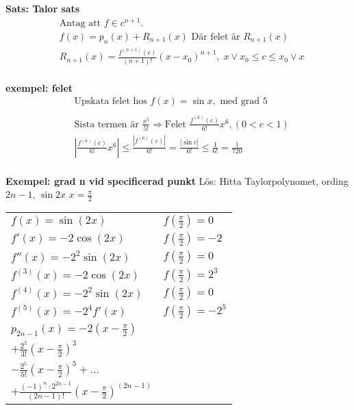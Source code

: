 \begin{multicols}{2}
\textbf{Sats: Talor sats}
\begin{align*}
  &\text{Antag att $f\in c^{n+1}$.} \\
  &f(x)=p_n(x)+R_{n+1}(x) \text{ Där felet är } R_{n+1}(x) \\
  &R_{n+1}(x)=\frac{f^{(n+1)}(c)}{(n+1)!}{(x-x_0)}^{n+1}, \; x \lor x_0 \leq c \leq x_0 \lor x \\
\end{align*}

\textbf{exempel: felet}
\begin{align*}
  &\text{Upskata felet hos } f(x)=\sin{x}, \text{ med grad } 5 \\
  &\\
  &\text{Sista termen är } \frac{x^5}{5!} \Rightarrow \text{Felet } \frac{f^{(6)}(c)}{6!}x^6, (0<c<1) \\
  &\left| \frac{f^{(6)}(c)}{6!}x^6 \right| \leq \frac{|f^{(6)}(c)|}{6!} = \frac{|\sin{c}|}{6!}
  \leq \frac{1}{6!} = \frac{1}{720} \\
\end{align*}


\textbf{Exempel: grad n vid specificerad punkt}
Lös: Hitta Taylorpolynomet, ording $2n-1$,  $\sin{2x}$  $x=\frac{\pi}{2}$ \\
\begin{center}
  \begin{tabular}{ p{3cm} p{1cm} }
   $f(x)=\sin(2x)$ & $f(\frac{\pi}{2})=0$ \\ 
   $f'(x)=-2\cos(2x)$ & $f(\frac{\pi}{2})=-2$ \\ 
   $f''(x)=-2^2\sin(2x)$ & $f(\frac{\pi}{2})=0$ \\ 
   $f^{(3)}(x)=-2\cos(2x)$ & $f(\frac{\pi}{2})=2^3$ \\ 
   $f^{(4)}(x)=-2^2\sin(2x)$ & $f(\frac{\pi}{2})=0$ \\ 
   $f^{(5)}(x)=-2^4f'(x)$ & $f(\frac{\pi}{2})=-2^5$ \\ 
   $p_{2n-1}(x)=-2(x-\frac{\pi}{2})$  & \\ 
   $+\frac{2^3}{3!}{(x-\frac{\pi}{2})}^3$ & \\ 
   $-\frac{2^5}{5!}{(x-\frac{\pi}{2})}^5+\ldots$ & \\ 
   $+\frac{{(-1)}^n\cdot2^{2n-1}}{(2n-1)!}{(x-\frac{\pi}{2})}^{(2n-1)}$ & \\ 
  \end{tabular}
\end{center}



\end{multicols}
